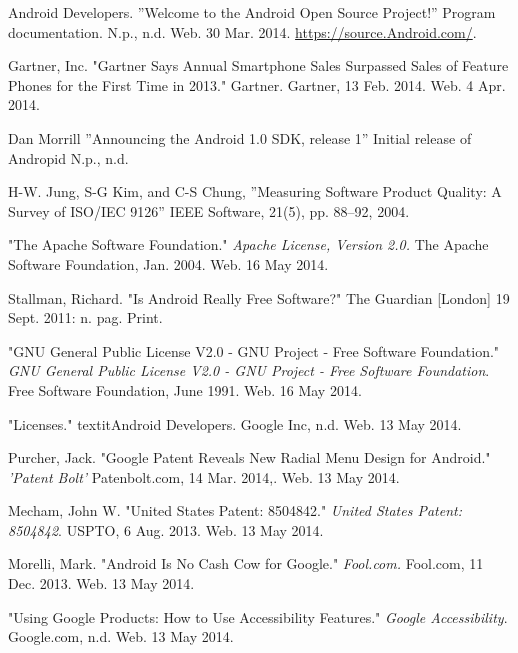 \documentclass[conference]{IEEEtran}
\begin{document}
\begin{thebibliography}{1}


Android Developers. ''Welcome to the Android Open Source Project!'' Program documentation. N.p., n.d. Web. 30 Mar. 2014. \url{https://source.Android.com/}.

Gartner, Inc. "Gartner Says Annual Smartphone Sales Surpassed Sales of Feature Phones for the First Time in 2013." Gartner. Gartner, 13 Feb. 2014. Web. 4 Apr. 2014.

Dan Morrill ''Announcing the Android 1.0 SDK, release 1'' Initial release of Andropid N.p., n.d. 

H-W. Jung, S-G Kim, and C-S Chung, ''Measuring Software Product Quality: A Survey of ISO/IEC 9126'' IEEE Software, 21(5), pp. 88--92, 2004.

"The Apache Software Foundation." \textit{Apache License, Version 2.0.} The Apache Software Foundation, Jan. 2004. Web. 16 May 2014.

Stallman, Richard. "Is Android Really Free Software?" The Guardian [London] 19 Sept. 2011: n. pag. Print.

"GNU General Public License V2.0 - GNU Project - Free Software Foundation." \textit{GNU General Public License V2.0 - GNU Project - Free Software Foundation}. Free Software Foundation, June 1991. Web. 16 May 2014.

"Licenses." textit{Android Developers}. Google Inc, n.d. Web. 13 May 2014.

Purcher, Jack. "Google Patent Reveals New Radial Menu Design for Android." \textit{'Patent Bolt'} Patenbolt.com, 14 Mar. 2014,. Web. 13 May 2014.

Mecham, John W. "United States Patent: 8504842." \textit{United States Patent: 8504842}. USPTO, 6 Aug. 2013. Web. 13 May 2014.

Morelli, Mark. "Android Is No Cash Cow for Google." \textit{Fool.com.} Fool.com, 11 Dec. 2013. Web. 13 May 2014.

"Using Google Products: How to Use Accessibility Features." \textit{Google Accessibility}. Google.com, n.d. Web. 13 May 2014.


\end{thebibliography}
\end{document}
